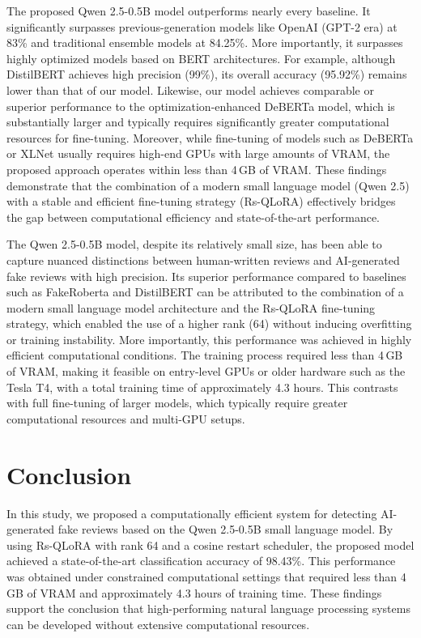 \documentclass[utf8]{FrontiersinHarvard}
\begin{document}
The proposed Qwen 2.5-0.5B model outperforms nearly every baseline. It significantly surpasses previous-generation models like OpenAI (GPT-2 era) at 83\% and traditional ensemble models at 84.25\%. More importantly, it surpasses highly optimized models based on BERT architectures. For example, although DistilBERT achieves high precision (99\%), its overall accuracy (95.92\%) remains lower than that of our model. Likewise, our model achieves comparable or superior performance to the optimization-enhanced DeBERTa model, which is substantially larger and typically requires significantly greater computational resources for fine-tuning. Moreover, while fine-tuning of models such as DeBERTa or XLNet usually requires high-end GPUs with large amounts of VRAM, the proposed approach operates within less than 4\,GB of VRAM. These findings demonstrate that the combination of a modern small language model (Qwen 2.5) with a stable and efficient fine-tuning strategy (Rs-QLoRA) effectively bridges the gap between computational efficiency and state-of-the-art performance.

The Qwen 2.5-0.5B model, despite its relatively small size, has been able to capture nuanced distinctions between human-written reviews and AI-generated fake reviews with high precision. Its superior performance compared to baselines such as FakeRoberta and DistilBERT can be attributed to the combination of a modern small language model architecture and the Rs-QLoRA fine-tuning strategy, which enabled the use of a higher rank (64) without inducing overfitting or training instability. More importantly, this performance was achieved in highly efficient computational conditions. The training process required less than 4\,GB of VRAM, making it feasible on entry-level GPUs or older hardware such as the Tesla T4, with a total training time of approximately 4.3 hours. This contrasts with full fine-tuning of larger models, which typically require greater computational resources and multi-GPU setups.



\section{Conclusion}

In this study, we proposed a computationally efficient system for detecting AI-generated fake reviews based on the Qwen 2.5-0.5B small language model. By using Rs-QLoRA with rank 64 and a cosine restart scheduler, the proposed model achieved a state-of-the-art classification accuracy of 98.43\%. This performance was obtained under constrained computational settings that required less than 4\,GB of VRAM and approximately 4.3 hours of training time. These findings support the conclusion that high-performing natural language processing systems can be developed without extensive computational resources.
\end{document}
